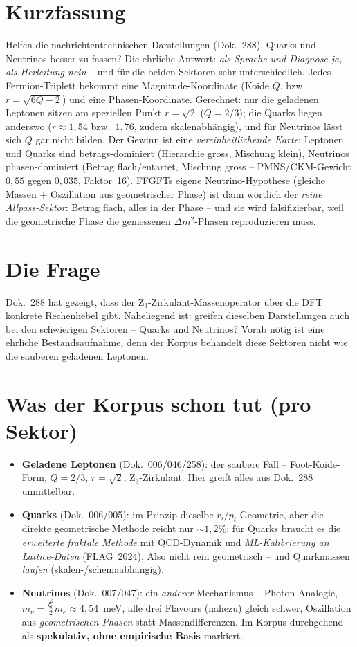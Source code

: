 \section*{Kurzfassung}
Helfen die nachrichtentechnischen Darstellungen (Dok.~288), Quarks und Neutrinos besser zu fassen?
Die ehrliche Antwort: \emph{als Sprache und Diagnose ja, als Herleitung nein} -- und für die beiden
Sektoren sehr unterschiedlich. Jedes Fermion-Triplett bekommt eine Magnitude-Koordinate (Koide $Q$,
bzw.\ $r=\sqrt{6Q-2}$) und eine Phasen-Koordinate. Gerechnet: nur die geladenen Leptonen sitzen am
speziellen Punkt $r=\sqrt2$ ($Q=2/3$); die Quarks liegen anderswo ($r\approx1{,}54$ bzw.\ $1{,}76$,
zudem skalenabhängig), und für Neutrinos lässt sich $Q$ gar nicht bilden. Der Gewinn ist eine
\emph{vereinheitlichende Karte}: Leptonen und Quarks sind betrags-dominiert (Hierarchie gross,
Mischung klein), Neutrinos phasen-dominiert (Betrag flach/entartet, Mischung gross -- PMNS/CKM-Gewicht
$0{,}55$ gegen $0{,}035$, Faktor~16). FFGFTs eigene Neutrino-Hypothese (gleiche Massen + Oszillation
aus geometrischer Phase) ist dann wörtlich der \emph{reine Allpass-Sektor}: Betrag flach, alles in der
Phase -- und sie wird falsifizierbar, weil die geometrische Phase die gemessenen $\Delta m^2$-Phasen
reproduzieren muss.

\section{Die Frage}
Dok.~288 hat gezeigt, dass der Z$_3$-Zirkulant-Massenoperator über die DFT konkrete Rechenhebel gibt.
Naheliegend ist: greifen dieselben Darstellungen auch bei den schwierigen Sektoren -- Quarks und
Neutrinos? Vorab nötig ist eine ehrliche Bestandsaufnahme, denn der Korpus behandelt diese Sektoren
nicht wie die sauberen geladenen Leptonen.

\section{Was der Korpus schon tut (pro Sektor)}
\begin{itemize}
  \item \textbf{Geladene Leptonen} (Dok.~006/046/258): der saubere Fall -- Foot-Koide-Form,
        $Q=2/3$, $r=\sqrt2$, Z$_3$-Zirkulant. Hier greift alles aus Dok.~288 unmittelbar.
  \item \textbf{Quarks} (Dok.~006/005): im Prinzip dieselbe $r_i/p_i$-Geometrie, aber die direkte
        geometrische Methode reicht nur $\sim1{,}2\%$; für Quarks braucht es die \emph{erweiterte
        fraktale Methode} mit QCD-Dynamik und \emph{ML-Kalibrierung an Lattice-Daten} (FLAG~2024).
        Also nicht rein geometrisch -- und Quarkmassen \emph{laufen} (skalen-/schemaabhängig).
  \item \textbf{Neutrinos} (Dok.~007/047): ein \emph{anderer} Mechanismus -- Photon-Analogie,
        $m_\nu=\tfrac{\xi_0^2}{2}m_e\approx4{,}54$~meV, alle drei Flavours (nahezu) gleich schwer,
        Oszillation aus \emph{geometrischen Phasen} statt Massendifferenzen. Im Korpus durchgehend
        als \textbf{spekulativ, ohne empirische Basis} markiert.
\end{itemize}

